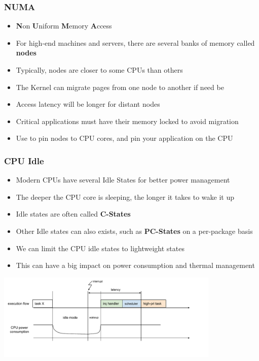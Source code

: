 \begin{frame}
	\frametitle{NUMA}
	\begin{itemize}
		\item \textbf{N}on \textbf{U}niform \textbf{M}emory \textbf{A}ccess
		\item For high-end machines and servers, there are several banks of memory called \textbf{nodes}
		\item Typically, nodes are closer to some CPUs than others 
		\item The Kernel can migrate pages from one node to another if need be
		\item Access latency will be longer for distant nodes
		\item Critical applications must have their memory locked to avoid migration
		\item Use  to pin nodes to CPU cores, and pin your application on the CPU
	\end{itemize}
\end{frame}

\begin{frame}
	\frametitle{CPU Idle}
	\begin{itemize}
		\item Modern CPUs have several Idle States for better power management
		\item The deeper the CPU core is sleeping, the longer it takes to wake it up
		\item Idle states are often called \textbf{C-States}
		\item Other Idle states can also exists, such as \textbf{PC-States} on a per-package basis
		\item We can limit the CPU idle states to lightweight states
		\item This can have a big impact on power consumption and thermal management
	\end{itemize}
	\includegraphics[width=0.8\textwidth]{slides/realtime-linux-hardware/cpuidle_latency}
\end{frame}

